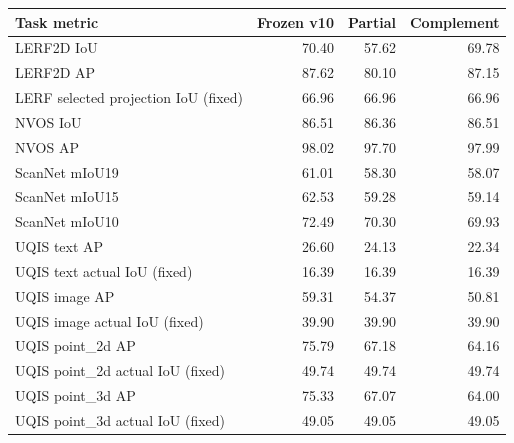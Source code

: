 \begin{tabular}{lrrr}
\toprule
Task metric & Frozen v10 & Partial & Complement \\
\midrule
LERF2D IoU & 70.40 & 57.62 & 69.78 \\
LERF2D AP & 87.62 & 80.10 & 87.15 \\
LERF selected projection IoU (fixed) & 66.96 & 66.96 & 66.96 \\
NVOS IoU & 86.51 & 86.36 & 86.51 \\
NVOS AP & 98.02 & 97.70 & 97.99 \\
ScanNet mIoU19 & 61.01 & 58.30 & 58.07 \\
ScanNet mIoU15 & 62.53 & 59.28 & 59.14 \\
ScanNet mIoU10 & 72.49 & 70.30 & 69.93 \\
UQIS text AP & 26.60 & 24.13 & 22.34 \\
UQIS text actual IoU (fixed) & 16.39 & 16.39 & 16.39 \\
UQIS image AP & 59.31 & 54.37 & 50.81 \\
UQIS image actual IoU (fixed) & 39.90 & 39.90 & 39.90 \\
UQIS point\_2d AP & 75.79 & 67.18 & 64.16 \\
UQIS point\_2d actual IoU (fixed) & 49.74 & 49.74 & 49.74 \\
UQIS point\_3d AP & 75.33 & 67.07 & 64.00 \\
UQIS point\_3d actual IoU (fixed) & 49.05 & 49.05 & 49.05 \\
\bottomrule
\end{tabular}
